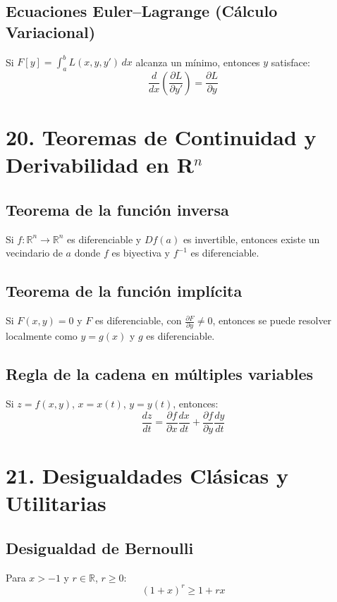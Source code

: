 \documentclass[12pt]{article}
\begin{document}
\subsection{Ecuaciones Euler–Lagrange (Cálculo Variacional)}
Si \(F[y] = \int_a^b L(x, y, y')\,dx\) alcanza un mínimo, entonces \(y\) satisface:
\[
\frac{d}{dx} \left( \frac{\partial L}{\partial y'} \right) = \frac{\partial L}{\partial y}
\]

\section{20. Teoremas de Continuidad y Derivabilidad en R\(^{n}\)}

\subsection{Teorema de la función inversa}
Si \(f: \mathbb{R}^n \to \mathbb{R}^n\) es diferenciable y \(Df(a)\) es invertible, entonces existe un vecindario de \(a\) donde \(f\) es biyectiva y \(f^{-1}\) es diferenciable.

\subsection{Teorema de la función implícita}
Si \(F(x, y) = 0\) y \(F\) es diferenciable, con \(\frac{\partial F}{\partial y} \neq 0\), entonces se puede resolver localmente como \(y = g(x)\) y \(g\) es diferenciable.

\subsection{Regla de la cadena en múltiples variables}
Si \(z = f(x, y)\), \(x = x(t)\), \(y = y(t)\), entonces:
\[
\frac{dz}{dt} = \frac{\partial f}{\partial x} \frac{dx}{dt} + \frac{\partial f}{\partial y} \frac{dy}{dt}
\]

\newpage


\section{21. Desigualdades Clásicas y Utilitarias}

\subsection{Desigualdad de Bernoulli}
Para \(x > -1\) y \(r \in \mathbb{R}\), \(r \geq 0\):
\[
(1 + x)^r \geq 1 + rx
\]
\end{document}
